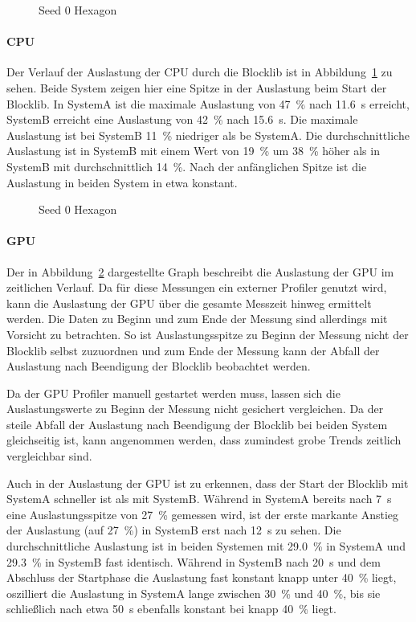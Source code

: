 \begin{figure}[!htbp]
	\caption{Seed 0 Hexagon}\label{fig:seed-0-hexagon-cpu}
\end{figure}
\paragraph{CPU} Der Verlauf der Auslastung der CPU durch die Blocklib ist in Abbildung~\ref{fig:seed-0-hexagon-cpu} zu sehen. Beide System zeigen hier eine Spitze in der Auslastung beim Start der Blocklib. In SystemA ist die maximale Auslastung von \SI{47}{\percent} nach \SI{11,6}{\second} erreicht, SystemB erreicht eine Auslastung von \SI{42}{\percent} nach \SI{15,6}{\second}. Die maximale Auslastung ist bei SystemB \SI{11}{\percent} niedriger als be SystemA. Die durchschnittliche Auslastung ist in SystemB mit einem Wert von \SI{19}{\percent} um \SI{38}{\percent} höher als in SystemB mit durchschnittlich \SI{14}{\percent}. Nach der anfänglichen Spitze ist die Auslastung in beiden System in etwa konstant.

\begin{figure}[!htbp]
	\caption{Seed 0 Hexagon}\label{fig:seed-0-hexagon-gpu}
\end{figure}
\paragraph{GPU} Der in Abbildung~\ref{fig:seed-0-hexagon-gpu} dargestellte Graph beschreibt die Auslastung der GPU im zeitlichen Verlauf. Da für diese Messungen ein externer Profiler genutzt wird, kann die Auslastung der GPU über die gesamte Messzeit hinweg ermittelt werden. Die Daten zu Beginn und zum Ende der Messung sind allerdings mit Vorsicht zu betrachten. So ist Auslastungsspitze zu Beginn der Messung nicht der Blocklib selbst zuzuordnen und zum Ende der Messung kann der Abfall der Auslastung nach Beendigung der Blocklib beobachtet werden. 

Da der GPU Profiler manuell gestartet werden muss, lassen sich die Auslastungswerte zu Beginn der Messung nicht gesichert vergleichen. Da der steile Abfall der Auslastung nach Beendigung der Blocklib bei beiden System gleichseitig ist, kann angenommen werden, dass zumindest grobe Trends zeitlich vergleichbar sind.

Auch in der Auslastung der GPU ist zu erkennen, dass der Start der Blocklib mit SystemA schneller ist als mit SystemB. Während in SystemA bereits nach \SI{7}{\second} eine Auslastungsspitze von \SI{27}{\percent} gemessen wird, ist der erste markante Anstieg der Auslastung (auf \SI{27}{\percent}) in SystemB  erst nach \SI{12}{\second} zu sehen. Die durchschnittliche Auslastung ist in beiden Systemen mit \SI{29,0}{\percent} in SystemA und \SI{29,3}{\percent} in SystemB fast identisch. Während in SystemB nach \SI{20}{\second} und dem Abschluss der Startphase die Auslastung fast konstant knapp unter \SI{40}{\percent} liegt, oszilliert die Auslastung in SystemA lange zwischen \SI{30}{\percent} und \SI{40}{\percent}, bis sie schließlich nach etwa \SI{50}{\second} ebenfalls konstant bei knapp \SI{40}{\percent} liegt.

